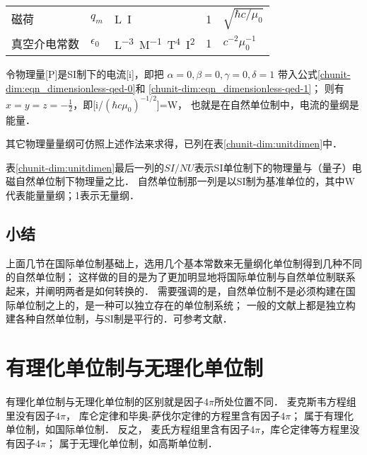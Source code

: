 \begin{longtable}{|*5{l|}}
    磁荷 & $q_m$     &   \si{L^{}I^{}}      &   \si{1}&   $\sqrt{ \hbar c /\mu_0}$ \\
    真空介电常数 & $\epsilon_0$    &   \si{L^{-3}M^{-1}T^{4}I^{2}} &  \si{1}  & $c^{-2} \mu_0^{-1}$\\
    \hline
\end{longtable}

令物理量[\si{P}]是SI制下的电流[\si{i}]，即把
$\alpha=0,\beta=0,\gamma=0,\delta=1$
带入公式\eqref{chunit-dim:eqn_dimensionless-qed-0}和
\eqref{chunit-dim:eqn_dimensionless-qed-1}；
则有$x=y=z=-\frac{1}{2}$，即[\si{i}/$(\hbar c \mu_0)^{-1/2}$]=\si{W}，
也就是在自然单位制中，电流的量纲是能量．

其它物理量量纲可仿照上述作法来求得，已列在表\ref{chunit-dim:unitdimen}中．

表\ref{chunit-dim:unitdimen}最后一列的$SI/NU$表示SI单位制下的物理量与（量子）电磁自然单位制下物理量之比．
自然单位制那一列是以SI制为基准单位的，其中\si{W}代表能量量纲；\si{1}表示无量纲．




\subsection*{小结}
上面几节在国际单位制基础上，选用几个基本常数来无量纲化单位制得到几种不同的自然单位制；
这样做的目的是为了更加明显地将国际单位制与自然单位制联系起来，并阐明两者是如何转换的．
需要强调的是，自然单位制不是必须构建在国际单位制之上的，是一种可以独立存在的单位制系统；
一般的文献上都是独立构建各种自然单位制，与SI制是平行的．可参考文献\parencite[Ch. 5]{liang_cao2020}．




\section{有理化单位制与无理化单位制}
有理化单位制与无理化单位制的区别就是因子$4\pi$所处位置不同．
麦克斯韦方程组里没有因子$4\pi$，
库仑定律和毕奥-萨伐尔定律的方程里含有因子$4\pi$；
属于{\kaishu 有理化单位制}，如国际单位制． 反之，
麦氏方程组里含有因子$4\pi$，库仑定律等方程里没有因子$4\pi$；
属于{\kaishu 无理化单位制}，如高斯单位制．



